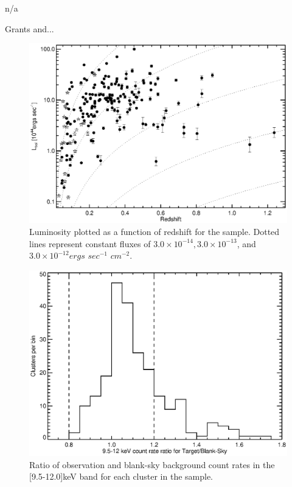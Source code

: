 \documentclass[12pt, preprint]{aastex}
\begin{document}
n/a

\acknowledgements
Grants and...




\begin{figure}[htp]
\begin{center}
\includegraphics[scale=1.0]{lx_z}
\caption{\small Luminosity plotted as a function of redshift for the
sample. Dotted lines represent constant fluxes of $3.0\times10^{-14},
3.0\times10^{-13}$, and $3.0\times10^{-12} ergs$ $sec^{-1}$ $cm^{-2}$.}
\label{fig:lx_z}
\end{center}
\end{figure}

\begin{figure}[htp]
\begin{center}
\includegraphics[scale=1.0]{bgd_fig}
\caption{\small Ratio of observation and blank-sky background
count rates in the [9.5-12.0]keV band for each cluster in the sample.}
\label{fig:bgd}
\end{center}
\end{figure}
\end{document}
